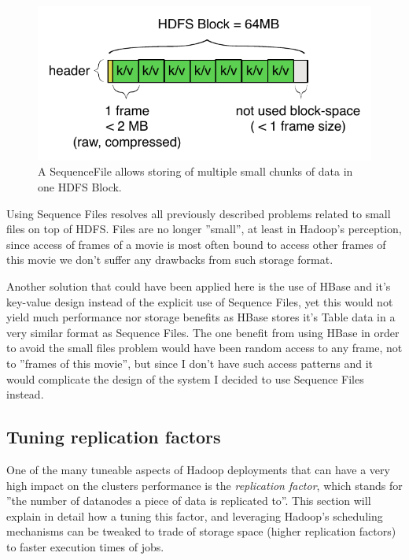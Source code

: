 \begin{figure}[ch!]
  \centering
  \includegraphics[scale=0.9]{diagrams/sequence-file.pdf}
  \caption{A SequenceFile allows storing of multiple small chunks of data in one HDFS Block.}
  \label{fig:sequence-file}
\end{figure}

Using Sequence Files resolves all previously described problems related to small files on top of HDFS. Files are no longer ''small'', at least in Hadoop's perception,
since access of frames of a movie is most often bound to access other frames of this movie we don't suffer any drawbacks from such storage format.

Another solution that could have been applied here is the use of HBase and it's key-value design instead of the explicit use of Sequence Files, yet this would not yield much performance nor storage benefits as HBase stores it's Table data in a very similar format as Sequence Files. The one benefit from using HBase in order to avoid the small files problem would have been random access to any frame, not to ''frames of this movie'', but since I don't have such access patterns and it would complicate the design of the system I decided to use Sequence Files instead.



\subsection{Tuning replication factors}
\label{sec:tuning-replication-factors}
One of the many tuneable aspects of Hadoop deployments that can have a very high impact on the clusters performance is the \textit{replication factor}, which stands for ''the number of datanodes a piece of data is replicated to''. This section will explain in detail how a tuning this factor, and leveraging Hadoop's scheduling mechanisms can be tweaked to trade of storage space (higher replication factors) to faster execution times of jobs.

